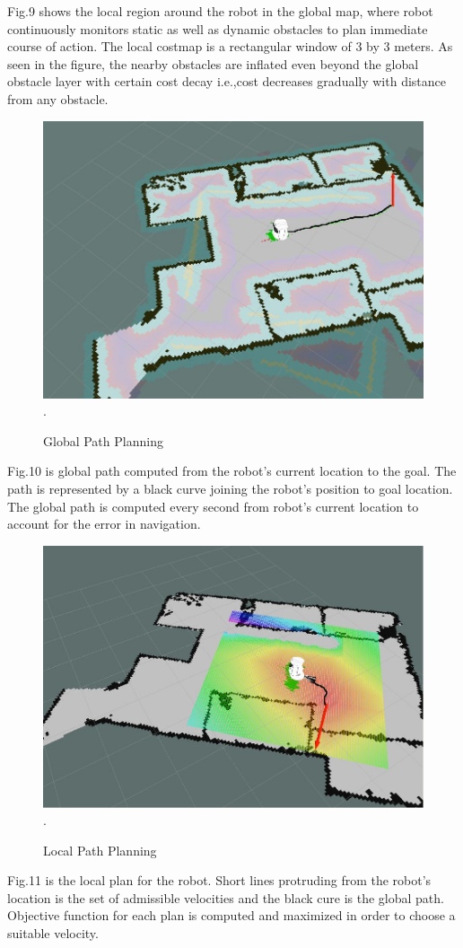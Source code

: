 \documentclass[journal,twoside]{IEEEtran}
\begin{document}
\par\noindent Fig.9 shows the local region around the robot in the global map, where robot continuously monitors static as well as dynamic obstacles to plan immediate course of action. The local costmap is a rectangular window of 3 by 3 meters. As seen in the figure, the nearby obstacles are inflated even beyond the global obstacle layer with certain cost decay i.e.,cost decreases gradually with distance from any obstacle.
\begin{figure}[h]
\centering
\includegraphics[scale=.27]{10.jpg}
\DeclareGraphicsExtensions.
\caption{Global Path Planning}
\end{figure}
\par\noindent Fig.10 is global path computed from the robot’s current location to the goal. The path is represented by a black curve joining the robot’s position to goal location. The global path is computed every second from robot’s current location to account for the error in navigation.  
\begin{figure}[h]
\centering
\includegraphics[scale=.27]{11.jpg}
\DeclareGraphicsExtensions.
\caption{Local Path Planning}
\end{figure}
\par\noindent Fig.11 is the local plan for the robot. Short lines protruding from the robot’s location is the set of admissible velocities and the black cure is the global path. Objective function for each plan is computed and maximized in order to choose a suitable velocity.
\end{document}
